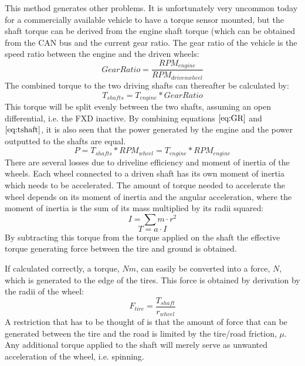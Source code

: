 This method generates other problems. It is unfortunately very uncommon today for a commercially available vehicle to have a torque sensor mounted, but the shaft torque can be derived from the engine shaft torque (which can be obtained from the CAN bus and the current gear ratio. The gear ratio of the vehicle is the speed ratio between the engine and the driven wheels:
\begin{equation}
	\label{eq:GR}
	Gear Ratio = \frac{RPM_{engine}}{RPM_{drivenwheel}}
\end{equation}
The combined torque to the two driving shafts can thereafter be calculated by:
\begin{equation}
	\label{eq:tshaft}
	T_{shafts} = T_{engine}*Gear Ratio
\end{equation}
This torque will be split evenly between the two shafts, assuming an open differential, i.e. the FXD inactive. By combining equations $ \ref{eq:GR} $ and $ \ref{eq:tshaft} $, it is also seen that the power generated by the engine and the power outputted to the shafts are equal.
\begin{equation}
	P = T_{shafts}*RPM_{wheel} = T_{engine}*RPM_{engine}
\end{equation}
There are several losses due to driveline efficiency and moment of inertia of the wheels. Each wheel connected to a driven shaft has its own moment of inertia which needs to be accelerated. The amount of torque needed to accelerate the wheel depends on its moment of inertia and the angular acceleration, where the moment of inertia is the sum of its mass multiplied by its radii squared:
\begin{equation}
I = \sum m \cdot r^2
\end{equation}
\begin{equation}
T = a \cdot I
\end{equation}
By subtracting this torque from the torque applied on the shaft the effective torque generating force between the tire and ground is obtained.

If calculated correctly, a torque, $ Nm $, can easily be converted into a force, $ N $, which is generated to the edge of the tires. This force is obtained by derivation by the radii of the wheel:
\begin{equation}
	F_{tire} = \frac{T_{shaft}}{r_{wheel}}
\end{equation}
A restriction that has to be thought of is that the amount of force that can be generated between the tire and the road is limited by the tire/road friction, $ \mu $. Any additional torque applied to the shaft will merely serve as unwanted acceleration of the wheel, i.e. spinning.


